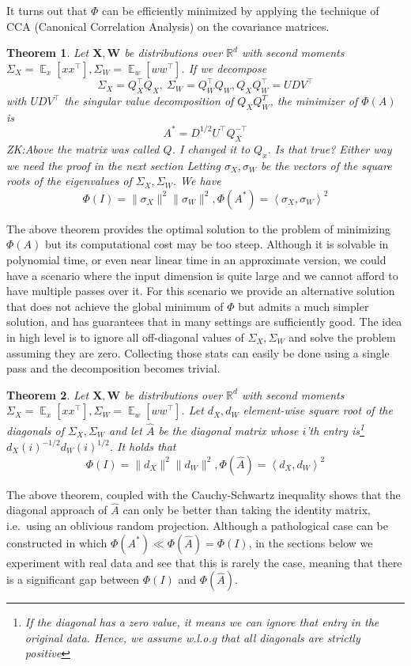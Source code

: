 \documentclass{article}
\newtheorem{theorem}{Theorem}[section]
\theoremstyle{definition}
\theoremstyle{plain}
\newcommand{\R}{\mathbb{R}}
\newcommand{\X}{\mathbf{X}}
\newcommand{\W}{\mathbf{W}}
\DeclareMathOperator{\E}{\mathbb{E}}
\newcommand{\ip}[1]{\left \langle #1 \right \rangle}
\newcommand{\zk}[1]{{\color{blue}ZK:#1}}
\begin{document}
It turns out that $\Phi$ can be efficiently minimized by applying the technique of CCA (Canonical Correlation Analysis) on the covariance matrices.

\begin{theorem} \label{thm:full}
Let $\X,\W$ be distributions over $\R^d$ with second moments $\Sigma_X=\E_x[xx^\top], \Sigma_W=\E_w[ww^\top]$. If we decompose 
$$ \Sigma_X = Q_X^\top Q_X, \ \Sigma_W = Q_W^\top Q_W, Q_XQ_W^\top = UDV^\top $$
with $UDV^\top$ the singular value decomposition of $Q_XQ_W^T$, the minimizer of $\Phi(A)$ is 
$$  A^* = D^{1/2} U^\top Q_X^{-\top}$$
\zk{Above the matrix was called $Q$. I changed it to $Q_x$. Is that true? Either way we need the proof in the next section}
Letting $\sigma_X, \sigma_W$ be the vectors of the square roots of the eigenvalues of $\Sigma_X, \Sigma_W$. We have
$$ \Phi(I) = \|\sigma_X\|^2 \|\sigma_W\|^2, \Phi(A^*) = \ip{\sigma_X, \sigma_W}^2 $$
\end{theorem}

The above theorem provides the optimal solution to the problem of minimizing $\Phi(A)$ but its computational cost may be too steep. Although it is solvable in polynomial time, or even near linear time in an approximate version, we could have a scenario where the input dimension is quite large and we cannot afford to have multiple passes over it. For this scenario we provide an alternative solution that does not achieve the global minimum of $\Phi$ but admits a much simpler solution, and has guarantees that in many settings are sufficiently good. The idea in high level is to ignore all off-diagonal values of $\Sigma_X, \Sigma_W$ and solve the problem assuming they are zero. Collecting those stats can easily be done using a single pass and the decomposition becomes trivial.

\begin{theorem} \label{thm:fast}
Let $\X,\W$ be distributions over $\R^d$ with second moments $\Sigma_X=\E_x[xx^\top], \Sigma_W=\E_w[ww^\top]$. Let $d_X,  d_W$ element-wise square root of the diagonals of $\Sigma_X, \Sigma_W$ and let $\hat{A}$ be the diagonal matrix whose $i$'th entry is\footnote{If the diagonal has a zero value, it means we can ignore that entry in the original data. Hence, we assume w.l.o.g that all diagonals are strictly positive} $d_X(i)^{-1/2} d_W(i)^{1/2}$. It holds that
$$ \Phi(I) = \|d_X\|^2 \|d_W\|^2, \Phi(\hat{A}) = \ip{d_X, d_W}^2 $$
\end{theorem}

The above theorem, coupled with the Cauchy-Schwartz inequality shows that the diagonal approach of $\hat{A}$ can only be better than taking the identity matrix, i.e.\ using an oblivious random projection. Although a pathological case can be constructed in which $\Phi(A^*) \ll \Phi(\hat{A}) = \Phi(I)$, in the sections below we experiment with real data and see that this is rarely the case, meaning that there is a significant gap between $\Phi(I)$ and $\Phi(\hat{A})$.
\end{document}
